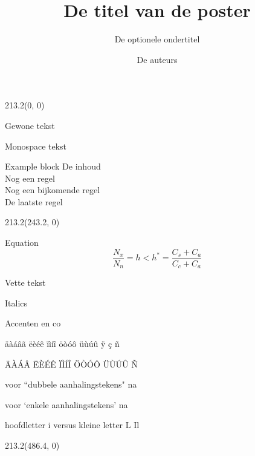\documentclass[final]{beamer}
\title{De titel van de poster}
\subtitle{De optionele ondertitel}
\author{De auteurs}
\begin{document}
\begin{frame}{} 

\begin{textblock}{213.2}(0, 0)
\begin{block}{Gewone tekst}
\lipsum[1]
\end{block}



\begin{block}{Monospace tekst}
\texttt{\lipsum[2]}
\end{block}



\begin{exampleblock}{Example block}
De inhoud\\
Nog een regel\\
Nog een bijkomende regel\\
De laatste regel
\end{exampleblock}

\end{textblock}


\begin{textblock}{213.2}(243.2, 0)

\begin{block}{Equation}
\begin{equation}
\dfrac{N_x}{N_n} = h < h^* = \dfrac{C_s + C_a}{C_c + C_a} \label{eq:RelCost}
\end{equation}
\end{block}

\begin{block}{Vette tekst}
\textbf{\lipsum[3]}
\end{block}

\begin{block}{Italics}
\textit{\lipsum[4]}
\end{block}

\begin{block}{Accenten en co}
  
äàáâã ëèéê ïìíî öòóô üùúû ÿ ç ñ 
  
ÄÀÁÂ ËÈÉÊ ÏÌÍÎ ÖÒÓÔ ÜÙÚÛ Ñ
  
voor ``dubbele aanhalingstekens" na

voor `enkele aanhalingstekens' na

hoofdletter i versus kleine letter L Il
\end{block}

\end{textblock}

\begin{textblock}{213.2}(486.4, 0)


\end{textblock}
\end{frame}
\end{document}
